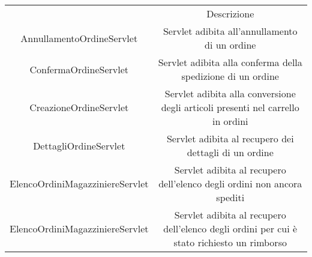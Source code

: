 \documentclass[12pt,a4paper]{article}
\begin{document}
\begin{center}
\begin{tabular}{|c|c|}
\hline
\rowcolor[HTML]{C0C0C0} 
\multicolumn{2}{|c|}{\cellcolor[HTML]{C0C0C0}Ordine} \\ \hline
\rowcolor[HTML]{C0C0C0}  \multicolumn{1}{|c|}{\cellcolor[HTML]{C0C0C0}Classe}  &  Descrizione \\ \hline

AnnullamentoOrdineServlet & \begin{minipage}{10cm} \vspace{5pt}
Servlet adibita all'annullamento di un ordine \vspace{5pt}
\end{minipage} \\ \hline

ConfermaOrdineServlet & \begin{minipage}{10cm} \vspace{5pt}
Servlet adibita alla conferma della spedizione di un ordine \vspace{5pt}
\end{minipage} \\ \hline

CreazioneOrdineServlet & \begin{minipage}{10cm} \vspace{5pt}
Servlet adibita alla conversione degli articoli presenti nel carrello in ordini \vspace{5pt}
\end{minipage} \\ \hline

DettagliOrdineServlet & \begin{minipage}{10cm} \vspace{5pt}
Servlet adibita al recupero dei dettagli di un ordine \vspace{5pt}
\end{minipage} \\ \hline

ElencoOrdiniMagazziniereServlet & \begin{minipage}{10cm} \vspace{5pt}
Servlet adibita al recupero dell'elenco degli ordini non ancora spediti \vspace{5pt}
\end{minipage} \\ \hline

ElencoOrdiniMagazziniereServlet & \begin{minipage}{10cm} \vspace{5pt}
Servlet adibita al recupero dell'elenco degli ordini per cui è stato richiesto un rimborso \vspace{5pt}
\end{minipage} \\ \hline


\end{tabular}
\end{center}
\end{document}
